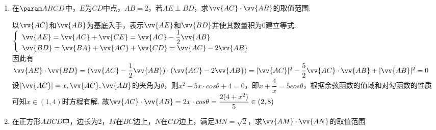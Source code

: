 \begin{enumerate}
\begin{jieda}
        $\because \left| \vv{AD}\right|  = 1,\vv{AD}$ 与 $\vv{AE}$ 所成的夹角为 $\dfrac{\pi }{3}$
        
        $\therefore \vv{AB} \cdot  \vv{AC} =  - 2 + \dfrac{5}{2} \cdot  \left| \vv{AE}\right|  - 2{\left| \vv{AE}\right| }^{2}$
        
        令 $\left| \vv{AE}\right|  = t > 0$ ,则 $\vv{AB} \cdot  \vv{AC} =  - 2{t}^{2} + \dfrac{5}{2}t - 2 =  - 2{\left( t - \dfrac{5}{8}\right) }^{2} - \dfrac{39}{32},t > 0$
        
        当 $\left| \vv{AE}\right|  = \dfrac{5}{8}$ 时, $\vv{AB} \cdot  \vv{AC}$ 的最大值为 $- \dfrac{39}{32}$ .
    \end{jieda}

    
    \item 在$\param ABCD$中，$E$为$CD$中点，$AB = 2$，若$AE \perp BD$，求$\vv{AC} \cdot \vv{AB}$的取值范围.
    \begin{jieda}
        以$\vv{AC}$和$\vv{AB}$为基底入手，表示$\vv{AE}$和$\vv{BD}$并使其数量积为0建立等式. \\
        $\left \{\begin{array}{l}
                \vv{AE} = \vv{AC} + \vv{CE} =  \vv{AC} - \dfrac{1}{2}\vv{AB}  \\
                \vv{BD} = \vv{BA} + \vv{AC} + \vv{CD} = \vv{AC} - 2\vv{AB} 
        \end{array} \right. $ \\
        因此有$\vv{AE} \cdot \vv{BD} = (\vv{AC} - \dfrac{1}{2}\vv{AB}) \cdot (\vv{AC} - 2\vv{AB}) = |\vv{AC}|^2 - \dfrac{5}{2} \vv{AC} \cdot \vv{AB} + |\vv{AB}|^2 = 0$\\
        设$|\vv{AC}| = x, \vv{AC}, \vv{AB}$的夹角为$\theta$，则$x^2 - 5x \cdot cos\theta + 4 = 0$，即$x + \dfrac{4}{x} = 5 cos\theta$，根据余弦函数的值域和对勾函数的性质可知$x \in (1,4)$时方程有解. 故$\vv{AC} \cdot \vv{AB} = 2x \cdot cos\theta = \dfrac{2(4+x^2)}{5} \in (2, 8)$
    \end{jieda}
    
    \item 在正方形$ABCD$中，边长为2，$M$在$BC$边上，$N$在$CD$边上，满足$MN=\sqrt{2}$，求$\vv{AM}\cdot \vv{AN}$的取值范围\blkda{$[4, 8-2\sqrt{2}]$}
    \begin{jieda}
\end{jieda}
\end{enumerate}
